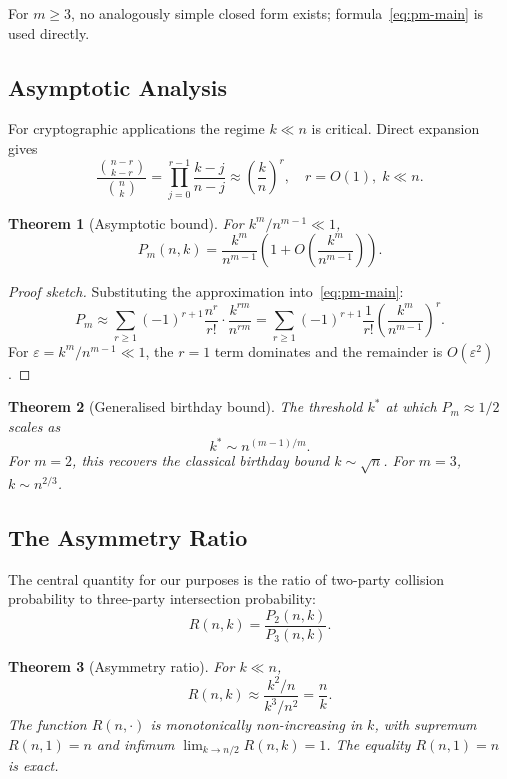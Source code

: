 \documentclass[11pt,a4paper]{article}
\newtheorem{theorem}{Theorem}
\begin{document}
For $m \geq 3$, no analogously simple closed form exists; formula~\eqref{eq:pm-main} is used directly.

\subsection{Asymptotic Analysis}

For cryptographic applications the regime $k \ll n$ is critical. Direct expansion gives
\[
\frac{\binom{n-r}{k-r}}{\binom{n}{k}} = \prod_{j=0}^{r-1} \frac{k - j}{n - j} \approx \left(\frac{k}{n}\right)^r, \quad r = O(1), \; k \ll n.
\]

\begin{theorem}[Asymptotic bound]\label{thm:asymptotic}
For $k^m / n^{m-1} \ll 1$,
\begin{equation}\label{eq:asymptotic}
P_m(n, k) = \frac{k^m}{n^{m-1}} \left(1 + O\!\left(\frac{k^m}{n^{m-1}}\right)\right).
\end{equation}
\end{theorem}

\begin{proof}[Proof sketch]
Substituting the approximation into~\eqref{eq:pm-main}:
\[
P_m \approx \sum_{r \geq 1} (-1)^{r+1} \frac{n^r}{r!} \cdot \frac{k^{rm}}{n^{rm}} = \sum_{r \geq 1} (-1)^{r+1} \frac{1}{r!} \left(\frac{k^m}{n^{m-1}}\right)^r.
\]
For $\varepsilon = k^m/n^{m-1} \ll 1$, the $r = 1$ term dominates and the remainder is $O(\varepsilon^2)$.
\end{proof}

\begin{theorem}[Generalised birthday bound]\label{thm:birthday-bound}
The threshold $k^*$ at which $P_m \approx 1/2$ scales as
\[
k^* \sim n^{(m-1)/m}.
\]
For $m = 2$, this recovers the classical birthday bound $k \sim \sqrt{n}$. For $m = 3$, $k \sim n^{2/3}$.
\end{theorem}

\subsection{The Asymmetry Ratio}\label{sec:asymmetry-ratio}

The central quantity for our purposes is the ratio of two-party collision probability to three-party intersection probability:
\[
R(n, k) = \frac{P_2(n, k)}{P_3(n, k)}.
\]

\begin{theorem}[Asymmetry ratio]\label{thm:asymmetry}
For $k \ll n$,
\begin{equation}\label{eq:asymmetry}
R(n, k) \approx \frac{k^2 / n}{k^3 / n^2} = \frac{n}{k}.
\end{equation}
The function $R(n, \cdot)$ is monotonically non-increasing in $k$, with supremum $R(n, 1) = n$ and infimum $\lim_{k \to n/2} R(n, k) = 1$. The equality $R(n, 1) = n$ is exact.
\end{theorem}
\end{document}
